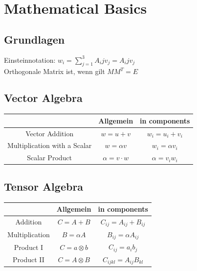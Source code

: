 \documentclass[a4paper]{scrartcl}
\begin{document}
\section{Mathematical Basics}
\subsection{Grundlagen}


Einsteinnotation: $w_i=\sum_{j=1}^{3}A_ijv_j=A_ijv_j$
\\
Orthogonale Matrix ist, wenn gilt $MM^T=E$
\\


\subsection{Vector Algebra}
\begin{tabular}{|c|c|c|}
\hline  & Allgemein & in components \\ 
\hline Vector Addition & $w=u+v$ & $w_i=u_i+v_i$ \\ 
\hline Multiplication with a Scalar & $w=\alpha v$ & $w_i=\alpha v_i$ \\ 
\hline Scalar Product & $\alpha = v \cdot w $ & $\alpha = v_i w_i$ \\ 
\hline 
\end{tabular} 

\subsection{Tensor Algebra}
\begin{tabular}{|c|c|c|}
\hline  & Allgemein & in components \\ 
\hline Addition & $C=A+B$ & $C_{ij}=A_{ij}+B_{ij}$ \\ 
\hline Multiplication& $B=\alpha A$ & $B_{ij}=\alpha A_{ij}$ \\ 
\hline Product I & $C = a \otimes b $ & $C_{ij} = a_i b_j$ \\ 
\hline Product II& $C = A \otimes B $ & $C_{ijkl} = A_{ij} B_{kl}$ \\
\hline 
\end{tabular} 
\end{document}
